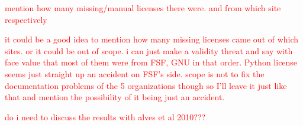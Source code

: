 \textcolor{red}{mention how many missing/manual licenses there were. and from which site respectively}

\textcolor{red}{it could be a good idea to mention how many missing licenses came out of which sites. or it could be out of scope. i can just make a validity threat and say with face value that most of them were from FSF, GNU in that order. Python license seems just straight up an accident on FSF's side. scope is not to fix the documentation problems of the 5 organizations though so I'll leave it just like that and mention the possibility of it being just an accident.}

\textcolor{red}{do i need to discuss the results with alves et al 2010???}